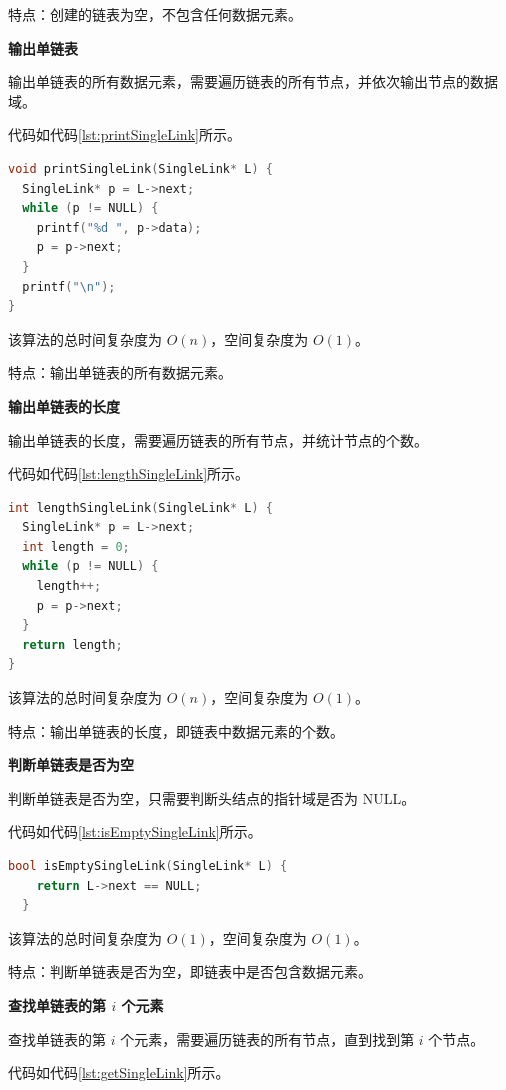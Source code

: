 \documentclass[lang=cn,newtx,10pt,scheme=chinese]{../elegantbook}
\begin{document}
特点：创建的链表为空，不包含任何数据元素。

\textbf{输出单链表}

输出单链表的所有数据元素，需要遍历链表的所有节点，并依次输出节点的数据域。

代码如代码\ref{lst:printSingleLink}所示。

\begin{lstlisting}[language=C++, caption={输出单链表示例代码}, label={lst:printSingleLink}]
void printSingleLink(SingleLink* L) {
  SingleLink* p = L->next;
  while (p != NULL) {
    printf("%d ", p->data);
    p = p->next;
  }
  printf("\n");
}
\end{lstlisting}
该算法的总时间复杂度为 $O(n)$，空间复杂度为 $O(1)$。

特点：输出单链表的所有数据元素。

\textbf{输出单链表的长度}

输出单链表的长度，需要遍历链表的所有节点，并统计节点的个数。

代码如代码\ref{lst:lengthSingleLink}所示。

\begin{lstlisting}[language=C++, caption={输出单链表长度示例代码}, label={lst:lengthSingleLink}]
int lengthSingleLink(SingleLink* L) {
  SingleLink* p = L->next;
  int length = 0;
  while (p != NULL) {
    length++;
    p = p->next;
  }
  return length;
}
\end{lstlisting}
该算法的总时间复杂度为 $O(n)$，空间复杂度为 $O(1)$。

特点：输出单链表的长度，即链表中数据元素的个数。

\textbf{判断单链表是否为空}

判断单链表是否为空，只需要判断头结点的指针域是否为 NULL。

代码如代码\ref{lst:isEmptySingleLink}所示。

\begin{lstlisting}[language=C++, caption={判断单链表是否为空示例代码}, label={lst:isEmptySingleLink}]
  bool isEmptySingleLink(SingleLink* L) {
    return L->next == NULL;
  }
  \end{lstlisting}
  该算法的总时间复杂度为 $O(1)$，空间复杂度为 $O(1)$。

  特点：判断单链表是否为空，即链表中是否包含数据元素。

\textbf{查找单链表的第 $i$ 个元素}

查找单链表的第 $i$ 个元素，需要遍历链表的所有节点，直到找到第 $i$ 个节点。

代码如代码\ref{lst:getSingleLink}所示。
\end{document}
